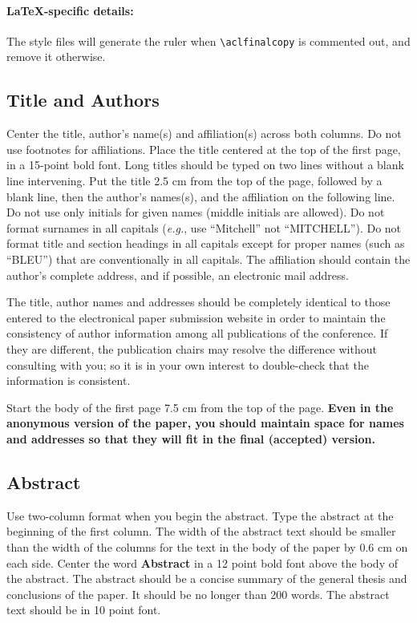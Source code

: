 \documentclass[11pt,a4paper]{article}
\begin{document}
\paragraph{\LaTeX-specific details:}
The style files will generate the ruler when {\small\verb|\aclfinalcopy|} is commented out, and remove it otherwise.

\subsection{Title and Authors}
\label{ssec:title-authors}

Center the title, author's name(s) and affiliation(s) across both columns.
Do not use footnotes for affiliations.
Place the title centered at the top of the first page, in a 15-point bold font.
Long titles should be typed on two lines without a blank line intervening.
Put the title 2.5 cm from the top of the page, followed by a blank line, then the author's names(s), and the affiliation on the following line.
Do not use only initials for given names (middle initials are allowed).
Do not format surnames in all capitals (\emph{e.g.}, use ``Mitchell'' not ``MITCHELL'').
Do not format title and section headings in all capitals except for proper names (such as ``BLEU'') that are
conventionally in all capitals.
The affiliation should contain the author's complete address, and if possible, an electronic mail address.

The title, author names and addresses should be completely identical to those entered to the electronical paper submission website in order to maintain the consistency of author information among all publications of the conference.
If they are different, the publication chairs may resolve the difference without consulting with you; so it is in your own interest to double-check that the information is consistent.

Start the body of the first page 7.5 cm from the top of the page.
\textbf{Even in the anonymous version of the paper, you should maintain space for names and addresses so that they will fit in the final (accepted) version.}


\subsection{Abstract}
Use two-column format when you begin the abstract.
Type the abstract at the beginning of the first column.
The width of the abstract text should be smaller than the
width of the columns for the text in the body of the paper by 0.6 cm on each side.
Center the word \textbf{Abstract} in a 12 point bold font above the body of the abstract.
The abstract should be a concise summary of the general thesis and conclusions of the paper.
It should be no longer than 200 words.
The abstract text should be in 10 point font.
\end{document}
